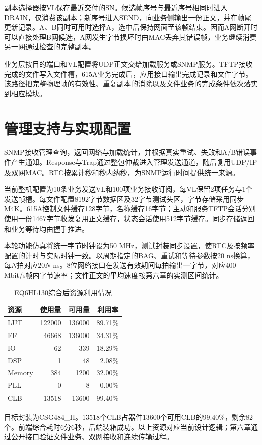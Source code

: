 副本选择器按VL保存最近交付的SN。候选帧序号与最近序号相同时进入DRAIN，仅消费该副本；新序号进入SEND，向业务侧输出一份正文，并在帧尾更新记录。A、B同时可用时选择A，选中后保持网面至该帧结束。因而A网断开时可以直接处理B网候选，A网发生字节损坏时由MAC丢弃其错误帧，业务继续消费另一网通过检查的完整副本。

业务层按目的端口和VL配置将UDP正文交给加载服务或SNMP服务。TFTP接收完成的文件写入文件槽，615A业务完成后，应用接口输出完成记录和文件字节。该路径把完整物理帧的有效性、重复副本的消除以及文件业务的完成条件依次落实到相应模块。

\section{管理支持与实现配置}
SNMP接收管理查询，返回网络与加载统计，并根据真实重试、失败和A/B错误事件产生通知。Response与Trap通过整包仲裁进入管理发送通道，随后复用UDP/IP及双网MAC。RTC按累计秒和秒内纳秒，为SNMP运行时间提供统一来源。

当前整机配置为10条业务发送VL和100项业务接收订阅，每VL保留2项任务与1个发送帧槽。每文件配置8192字节数据区及32字节测试头区，字节存储采用同步M4K。615A控制文件缓存128字节，名称缓存16字节；主动和服务TFTP会话分别使用一份1467字节收发复用正文缓存，状态会话使用512字节缓存。同步存储返回和业务等待均由握手推进。

本轮功能仿真将统一字节时钟设为50 MHz，测试封装同步设置，使RTC及按频率配置的计时与实际时钟一致。以周期指定的BAG、重试和等待参数按20 ns换算，每$N$拍对应$20N$ ns。8位网络接口在发送有效期间每拍输出一字节，对应400 Mbit/s帧内字节速率；文件正文的平均速度按第六章的实测区间统计。

\begin{table}[htbp]\centering\small
\caption{EQ6HL130综合后资源利用情况}
\begin{tabularx}{\linewidth}{@{}Y r r r@{}}\toprule
资源 & 使用量 & 可用量 & 利用率\\\midrule
LUT & 122000 & 136000 & 89.71\%\\
FF & 46668 & 136000 & 34.31\%\\
IO & 62 & 339 & 18.29\%\\
DSP & 1 & 48 & 2.08\%\\
Memory & 384 & 1200 & 32.00\%\\
PLL & 0 & 8 & 0.00\%\\
CLB & 13518 & 13600 & 99.40\%\\\bottomrule
\end{tabularx}\end{table}

目标封装为CSG484\_H。13518个CLB占器件13600个可用CLB的99.40\%，剩余82个。前端综合耗时6分6秒，后端装箱成功。以上资源对应当前设计逻辑；第六章通过公开接口验证文件业务、双网接收和连续传输过程。
